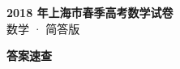 \documentclass[zihao=-4, a4paper]{ctexart}
\begin{document}
\begin{center}
  {\Large\bfseries 2018 年上海市春季高考数学试卷}\\[4pt]
  {\large 数学 · 简答版}
\end{center}
\medskip
{}

\clearpage
{}
\begin{center}{\Large\bfseries 答案速查}\end{center}
\medskip

\end{document}
